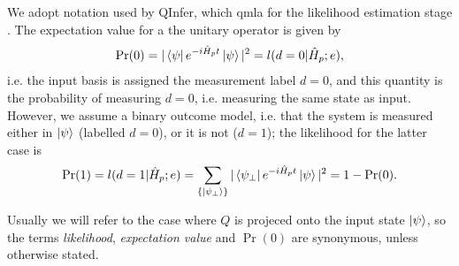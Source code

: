 We adopt notation used by QInfer, which \gls{qmla} for the likelihood estimation stage \cite{qinfer-1_0}. 
The expectation value for a the unitary operator is given by
\begin{equation}\label{eqn:pr0}
    \Pr(0) =  |\bra{\psi} e^{-i \hat{H}_p t} \ket{\psi}|^2  = l(d=0 | \hat{H}_p; e), 
\end{equation}
    i.e. the input basis is assigned the measurement label $d=0$, and this quantity is the probability 
    of measuring $d=0$, i.e. measuring the same state as input. 
However, we assume a binary outcome model, 
    i.e. that the system is measured either in $\ket{\psi}$ (labelled $d=0$), or it is not ($d=1$);
    the likelihood for the latter case is
\begin{equation}\label{eqn:pr1}
    \Pr(1) = l(d=1 | \hat{H}_p; e) = \sum_{\{\ket{\psi_{\perp}}\}} | \bra{\psi_{\perp}} e^{-i \hat{H}_p t} \ket{\psi}  |^2 = 1 - \Pr(0).
\end{equation}
\par 
Usually we will refer to the case where $Q$ is projeced onto the input state $\ket{\psi}$, 
    so the terms \emph{likelihood}, \emph{expectation value} and \emph{$\Pr(0)$} are synonymous, 
    unless otherwise stated. 


